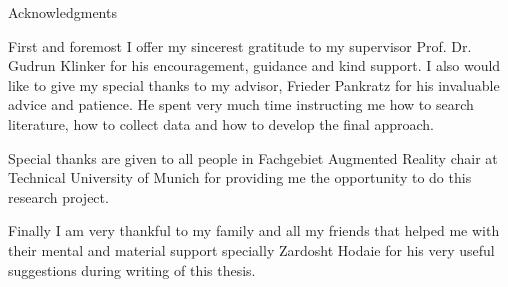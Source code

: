 \thispagestyle{empty}

\vspace*{2cm}

\begin{center}
{ Acknowledgments}
\end{center}

\vspace{1cm}
First and foremost I offer my sincerest gratitude to my supervisor Prof. Dr. Gudrun Klinker for his encouragement, guidance and kind support. I also would like to give my special thanks to my advisor, Frieder Pankratz for his invaluable advice and patience. He spent very much time instructing me how to search literature, how to collect data and how to develop the final approach.

Special thanks are given to all people in Fachgebiet Augmented Reality chair at Technical University of Munich for providing me the opportunity to do this research project.

Finally I am very thankful to my family and all my friends that helped me with their mental and material support specially Zardosht Hodaie for his very useful suggestions during writing of this thesis.
\cleardoublepage{}

